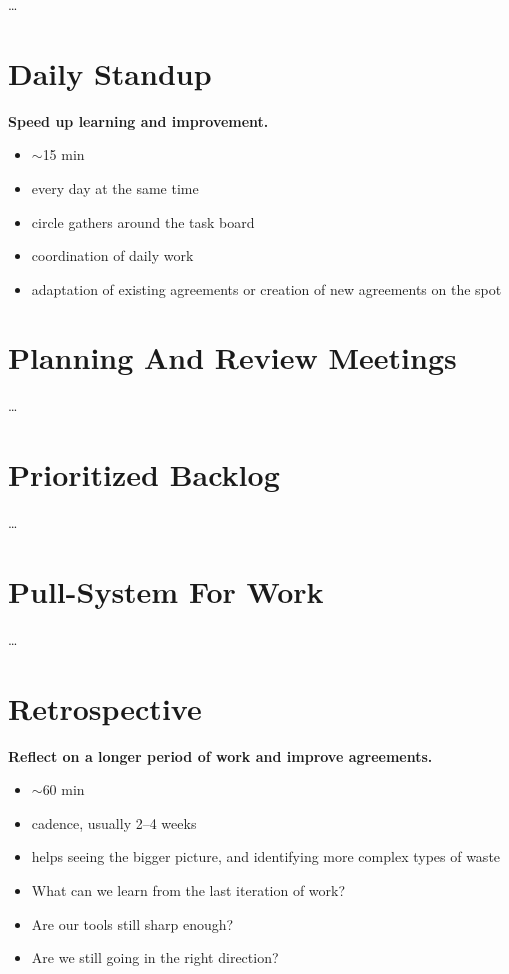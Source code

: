 {\ldots}

\section{Daily Standup}
\label{dailystandup}

\textbf{Speed up learning and improvement.}

\begin{itemize}
\item \ensuremath{\sim}15 min

\item every day at the same time

\item circle gathers around the task board

\item coordination of daily work

\item adaptation of existing agreements or creation of new agreements on the spot

\end{itemize}

\section{Planning And Review Meetings}
\label{planningandreviewmeetings}

{\ldots}

\section{Prioritized Backlog}
\label{prioritizedbacklog}

{\ldots}

\section{Pull-System For Work}
\label{pull-systemforwork}

{\ldots}

\section{Retrospective}
\label{retrospective}

\textbf{Reflect on a longer period of work and improve agreements.}

\begin{itemize}
\item \ensuremath{\sim}60 min

\item cadence, usually 2--4 weeks

\item helps seeing the bigger picture, and identifying more complex types of waste

\item What can we learn from the last iteration of work?

\item Are our tools still sharp enough?

\item Are we still going in the right direction?

\end{itemize}

